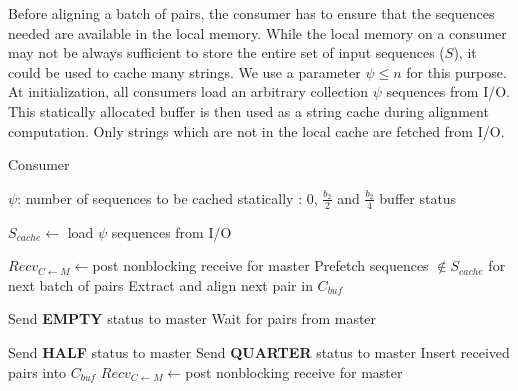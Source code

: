 \documentclass[10pt,journal,letterpaper,compsoc]{IEEEtran}
\begin{document}
Before aligning a batch of pairs, the consumer has to ensure that the sequences needed are available in the local memory. While the local memory on a consumer may not be always sufficient to store the entire set of input sequences ($S$), it could be used to cache many strings. We use a parameter $\psi \leq n$ for this purpose. At initialization, all consumers load an arbitrary collection $\psi$ sequences from I/O. This statically allocated buffer is then used as a string cache during alignment computation. Only strings which are not in the local cache are fetched from I/O.\\


\begin{algorithm}
\caption{Consumer}
\label{cs}
\begin{algorithmic}[1]

    \STATE $\psi$: number of sequences to be cached statically
    : $0$, $\frac{b_2}{2}$ and $\frac{b_2}{4}$ buffer status
   
    \STATE $S_{cache}\leftarrow$ load $\psi$ sequences from I/O
      
    \STATE $Recv_{C\leftarrow M}\leftarrow$post nonblocking receive for master
    \WHILE {\TRUE} 
            \STATE Prefetch sequences $\notin S_{cache}$ for next batch of pairs
            \ELSE 
                \STATE Extract and align next pair in $C_{buf}$
            \ENDIF
        \ENDIF
        
            \STATE Send {\bf EMPTY} status to master
            \STATE Wait for pairs from master
        \ENDIF

                \STATE Send {\bf HALF} status to  master
                \STATE Send {\bf QUARTER} status to  master
            \ENDIF
        \ELSE
        		\STATE Insert received pairs into $C_{buf}$
        		\STATE $Recv_{C\leftarrow M}\leftarrow$post nonblocking receive for master
        \ENDIF
    \ENDWHILE
\end{algorithmic}
\end{algorithm}
\end{document}
